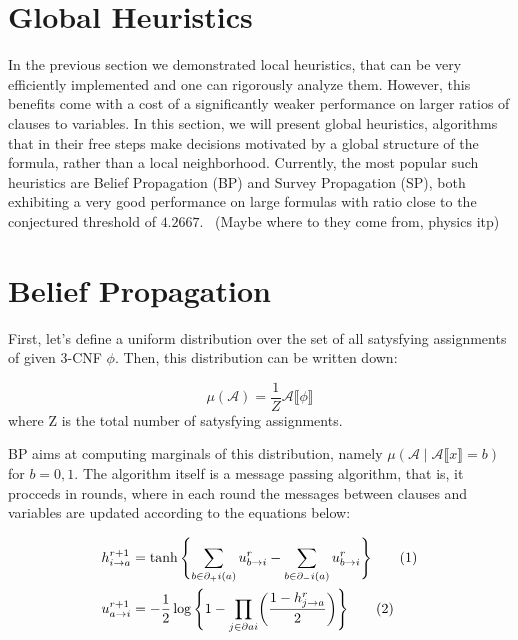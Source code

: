 \documentclass[10pt]{article}
\newcommand{\dbrackets}[1]{\llbracket#1\rrbracket}
\newcommand{\numberthis}{\addtocounter{equation}{1}\tag{\theequation}}
\newcommand{\umsg}[3]{u_{#1\rightarrow#2}^{#3}}
\newcommand{\hmsg}[3]{h_{#1\rightarrow#2}^{#3}}
\begin{document}
\section{Global Heuristics}


In the previous section we demonstrated local heuristics, that can be very efficiently implemented and one can rigorously analyze them. However, this benefits come with a cost of a significantly weaker performance on larger ratios of clauses to variables. In this section, we will present global heuristics, algorithms that in their free steps make decisions motivated by a global structure of the formula, rather than a local neighborhood. Currently, the most popular such heuristics are Belief Propagation (BP) and Survey Propagation (SP), both exhibiting a very good performance on large formulas with ratio close to the conjectured threshold of $4.2667$.~\cite{survey_propagation}
(Maybe where to they come from, physics itp)


\section{Belief Propagation}
First, let's define a uniform distribution over the set of all satysfying assignments of given 3-CNF $\phi$. Then, this distribution can be written down:

\begin{equation}
\label{eq:uniform}
\mu(\mathcal{A}) = \frac{1}{Z} \mathcal{A} \dbrackets{\phi}
\end{equation}
where Z is the total number of satysfying assignments. 
\par 
BP aims at computing marginals of this distribution, namely $\mu(\mathcal{A} \mid \mathcal{A} \dbrackets{x} = b)$ for $b = 0, 1$. The algorithm itself is a message passing algorithm, that is, it procceds in rounds, where in each round the messages between clauses and variables are updated according to the equations below:

\begin{align}
    \hmsg{i}{a}{r+1} &= \tanh{ \Biggl\{ \sum_{b \in {\partial_+}i(a)} \umsg{b}{i}{r} - \sum_{b \in {\partial_-}i(a)} \umsg{b}{i}{r} \Biggr\} }
    \numberthis \label{eq:messages:h} \\
    \umsg{a}{i}{r+1} &= - \frac{1}{2} \log{ \Biggl\{ 1 - \prod_{j \in \partial a  i}  \biggl(\frac{1 - \hmsg{j}{a}{r}}{2} \biggr) \Biggr\}}
    \numberthis \label{eq:message:u}
\end{align}
\end{document}
